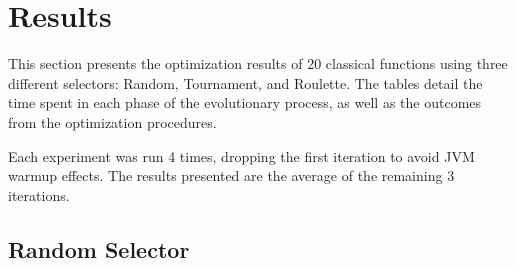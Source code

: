 \section{Results}
\label{sec:fn_opt:results}

  This section presents the optimization results of 20 classical functions 
  using three different selectors: Random, Tournament, and Roulette. The tables 
  detail the time spent in each phase of the evolutionary process, as well as 
  the outcomes from the optimization procedures.

  Each experiment was run 4 times, dropping the first iteration to avoid
  JVM warmup effects. The results presented are the average of the remaining
  3 iterations.

  \subsection{Random Selector}
